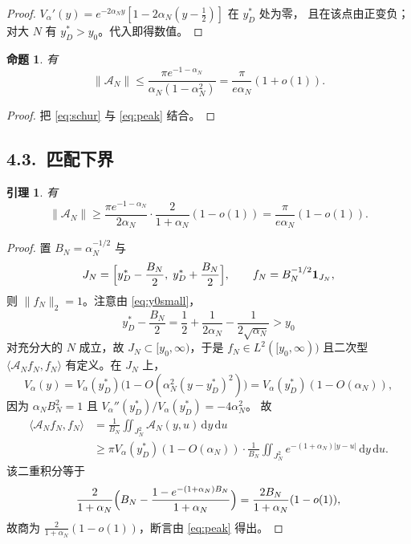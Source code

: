 \documentclass[12pt,a4paper]{amsart}
\numberwithin{equation}{section}
\theoremstyle{plain}
\newtheorem{proposition}[theorem]{命题}
\newtheorem{lemma}[theorem]{引理}
\theoremstyle{definition}
\newcommand{\dd}{\,\mathrm{d}}
\begin{document}
\begin{proof}
$V_\alpha'(y)=e^{-2\alpha_Ny}[1-2\alpha_N(y-\frac12)]$ 在 $y_D^*$ 处为零，
且在该点由正变负；对大 $N$ 有 $y_D^*>y_0$。代入即得数值。
\end{proof}

\begin{proposition}\label{prop:schur}
有
\begin{equation}\label{eq:upper}
 \|\mathscr A_N\|\le\frac{\pi e^{-1-\alpha_N}}{\alpha_N(1-\alpha_N^2)}
 =\frac{\pi}{e\alpha_N}(1+o(1)).
\end{equation}
\end{proposition}

\begin{proof}
把 \eqref{eq:schur} 与 \eqref{eq:peak} 结合。
\end{proof}

\subsection*{4.3.\ 匹配下界}

\begin{lemma}\label{lem:lower}
有
\begin{equation}\label{eq:lower}
 \|\mathscr A_N\|\ge\frac{\pi e^{-1-\alpha_N}}{2\alpha_N}
 \cdot\frac{2}{1+\alpha_N}(1-o(1))
 =\frac{\pi}{e\alpha_N}(1-o(1)).
\end{equation}
\end{lemma}

\begin{proof}
置 $B_N=\alpha_N^{-1/2}$ 与
\[
 J_N=\Bigl[y_D^*-\frac{B_N}2,\;y_D^*+\frac{B_N}2\Bigr],
 \qquad f_N=B_N^{-1/2}\mathbf 1_{J_N},
\]
则 $\|f_N\|_2=1$。注意由 \eqref{eq:y0small}，
\[
 y_D^*-\frac{B_N}2=\frac12+\frac{1}{2\alpha_N}-\frac{1}{2\sqrt{\alpha_N}}>y_0
\]
对充分大的 $N$ 成立，故 $J_N\subset[y_0,\infty)$，于是 $f_N\in L^2([y_0,\infty))$
且二次型 $\langle\mathscr A_Nf_N,f_N\rangle$ 有定义。在 $J_N$ 上，
\[
 V_\alpha(y)=V_\alpha(y_D^*)\bigl(1-O(\alpha_N^2(y-y_D^*)^2)\bigr)
 =V_\alpha(y_D^*)(1-O(\alpha_N)),
\]
因为 $\alpha_NB_N^2=1$ 且 $V_\alpha''(y_D^*)/V_\alpha(y_D^*)=-4\alpha_N^2$。
故
\[
 \begin{aligned}
 \langle\mathscr A_Nf_N,f_N\rangle
 &=\frac1{B_N}\iint_{J_N^2}\mathscr A_N(y,u)\dd y\dd u\\
 &\ge\pi V_\alpha(y_D^*)(1-O(\alpha_N))
 \cdot\frac1{B_N}\iint_{J_N^2}e^{-(1+\alpha_N)|y-u|}\dd y\dd u .
 \end{aligned}
\]
该二重积分等于
\[
 \frac2{1+\alpha_N}\Bigl(B_N-\frac{1-e^{-(1+\alpha_N)B_N}}{1+\alpha_N}\Bigr)
 =\frac{2B_N}{1+\alpha_N}(1-o(1)),
\]
故商为 $\frac{2}{1+\alpha_N}(1-o(1))$，断言由 \eqref{eq:peak} 得出。
\end{proof}
\end{document}
